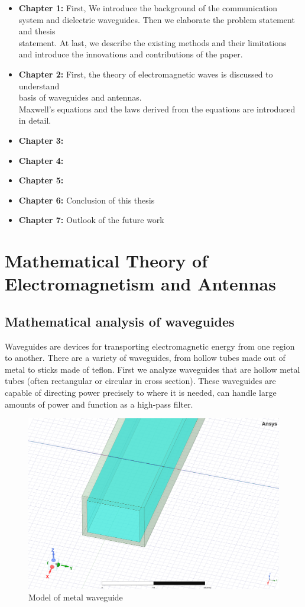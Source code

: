 \documentclass[a4paper,12pt]{report}
\begin{document}
\begin{itemize}
  \item[] \textbf{Chapter 1:} First, We introduce the background of the communication \\
  system and dielectric waveguides. Then we elaborate the problem statement and thesis \\
  statement. At last, we describe the existing methods and their limitations \\
  and introduce the innovations and contributions of the paper.
  \item[] \textbf{Chapter 2:} First, the theory of electromagnetic waves is discussed to understand \\
  basis of waveguides and antennas. \\
  Maxwell's equations and the laws derived from the equations are introduced in detail.
  \item[] \textbf{Chapter 3:} %
  \item[] \textbf{Chapter 4:}
  \item[] \textbf{Chapter 5:}
  \item[] \textbf{Chapter 6:} Conclusion of this thesis
  \item[] \textbf{Chapter 7:} Outlook of the future work
\end{itemize}


\chapter{Mathematical Theory of Electromagnetism and Antennas }

\section{Mathematical analysis of waveguides}

Waveguides are devices for transporting electromagnetic energy
from one region to another.
There are a variety of waveguides, from hollow tubes made out of metal to
sticks made of teflon.
First we analyze waveguides that are hollow metal tubes
(often rectangular or circular in cross section).
These waveguides are capable of directing power precisely to where it is needed,
can handle large amounts of power and function as a high-pass filter.

\begin{figure}
  \begin{center}
    \includegraphics[clip, keepaspectratio, width=0.5\linewidth]{img/metal_waveguide.png}
    \caption{Model of metal waveguide}
    \label{fig:metal_waveguide}
  \end{center}
\end{figure}
\end{document}
